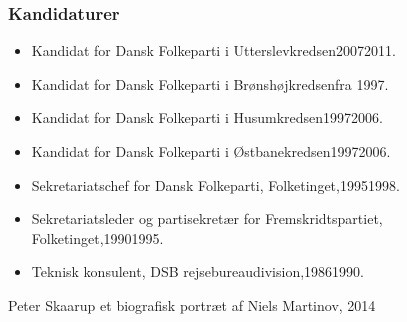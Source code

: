 \documentclass[11pt, a4paper]{awesome-cv}
\begin{document}
\begin{cvletter}
\subsubsection*{Kandidaturer}
\begin{itemize}
\item Kandidat for Dansk Folkeparti i Utterslevkredsen20072011.
\item Kandidat for Dansk Folkeparti i Brønshøjkredsenfra 1997.
\item Kandidat for Dansk Folkeparti i Husumkredsen19972006.
\item Kandidat for Dansk Folkeparti i Østbanekredsen19972006.
\end{itemize}
\begin{itemize}
\item Sekretariatschef for Dansk Folkeparti, Folketinget,19951998.
\item Sekretariatsleder og partisekretær for Fremskridtspartiet, Folketinget,19901995.
\item Teknisk konsulent, DSB rejsebureaudivision,19861990.
\end{itemize}
Peter Skaarup  et biografisk portræt af Niels Martinov, 2014

\end{cvletter}
\end{document}
